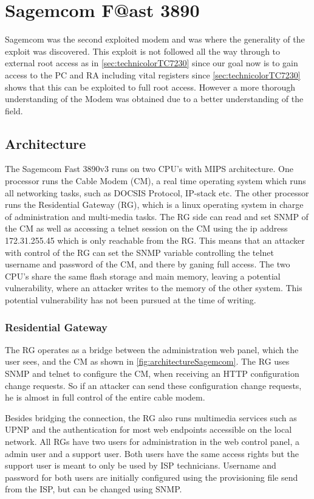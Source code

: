 \section{Sagemcom F@ast 3890}
Sagemcom was the second exploited modem and was where the generality of the exploit was discovered.
This exploit is not followed all the way through to external root access as in \cref{sec:technicolorTC7230} since our goal now is to gain access to the PC and RA including vital registers since \cref{sec:technicolorTC7230} shows that this can be exploited to full root access.
However a more thorough understanding of the Modem was obtained due to a better understanding of the field.

\subsection{Architecture}
The Sagemcom Fast 3890v3 runs on two CPU’s with MIPS architecture.
One processor runs the Cable Modem (CM), a real time operating system which runs all networking tasks, such as DOCSIS Protocol, IP-stack etc. 
The other processor runs the Residential Gateway (RG), which is a linux operating system in charge of administration and multi-media
tasks. 
The RG side can read and set SNMP of the CM as well as accessing a telnet session on the CM using the ip address 172.31.255.45 which is only reachable from the RG.
This means that an attacker with control of the RG can set the SNMP variable controlling the telnet username and password of the CM, and there by ganing full access.
The two CPU’s share the same flash storage and main memory, leaving a potential vulnerability, where an attacker writes to the memory of the other system. 
This potential vulnerability has not been pursued at the time of writing.

\subsubsection{Residential Gateway}
\label{subsec:residentialGateway}
The RG operates as a bridge between the administration web panel, which the user sees, and the CM as shown in \cref{fig:architectureSagemcom}. 
The RG uses SNMP and telnet to configure the CM, when receiving an HTTP configuration change requests.
So if an attacker can send these configuration change requests, he is almost in full control of the entire cable modem. 

Besides bridging the connection, the RG also runs multimedia services such as UPNP and the authentication for most web endpoints accessible on the local network. 
All RGs have two users for administration in the web control panel, a admin user and a support user. Both users have the same access rights but the support user is meant to only be used by ISP technicians.
Username and password for both users are initially configured using the provisioning file send from the ISP, but can be changed using SNMP.

